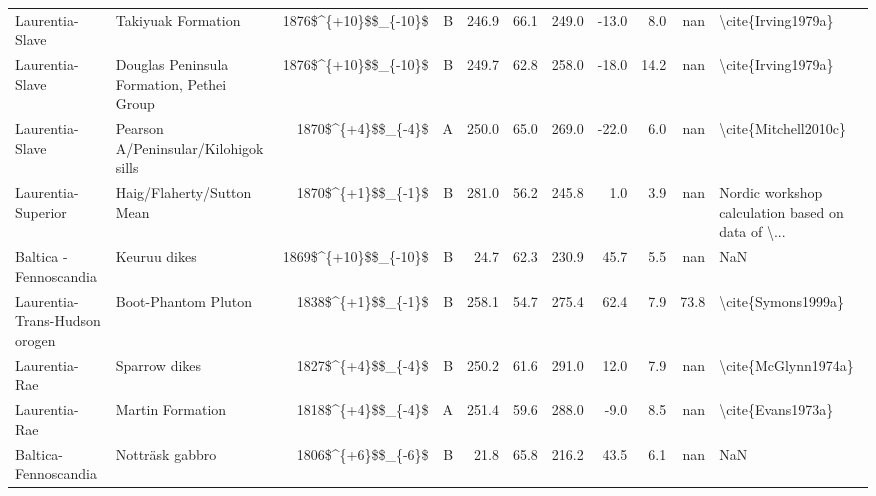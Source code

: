 \begin{longtable}{p{1 in}p{1 in}rrrrrrrr}
               Laurentia-Slave &                                 Takiyuak Formation &   1876\$\textasciicircum \{+10\}\$\$\_\{-10\}\$ &      B &     246.9 &      66.1 & 249.0 & -13.0 &       8.0 &         nan &                                 \textbackslash cite\{Irving1979a\} \\
               Laurentia-Slave &          Douglas Peninsula Formation, Pethei Group &   1876\$\textasciicircum \{+10\}\$\$\_\{-10\}\$ &      B &     249.7 &      62.8 & 258.0 & -18.0 &      14.2 &         nan &                                 \textbackslash cite\{Irving1979a\} \\
               Laurentia-Slave &               Pearson A/Peninsular/Kilohigok sills &     1870\$\textasciicircum \{+4\}\$\$\_\{-4\}\$ &      A &     250.0 &      65.0 & 269.0 & -22.0 &       6.0 &         nan &                               \textbackslash cite\{Mitchell2010c\} \\
            Laurentia-Superior &                         Haig/Flaherty/Sutton Mean  &     1870\$\textasciicircum \{+1\}\$\$\_\{-1\}\$ &      B &     281.0 &      56.2 & 245.8 &   1.0 &       3.9 &         nan &  Nordic workshop calculation based on data of \textbackslash ... \\
        Baltica - Fennoscandia &                                      Keuruu dikes  &   1869\$\textasciicircum \{+10\}\$\$\_\{-10\}\$ &     B  &      24.7 &      62.3 & 230.9 &  45.7 &       5.5 &         nan &                                                NaN \\
 Laurentia-Trans-Hudson orogen &                                Boot-Phantom Pluton &     1838\$\textasciicircum \{+1\}\$\$\_\{-1\}\$ &      B &     258.1 &      54.7 & 275.4 &  62.4 &       7.9 &        73.8 &                                 \textbackslash cite\{Symons1999a\} \\
                 Laurentia-Rae &                                      Sparrow dikes &     1827\$\textasciicircum \{+4\}\$\$\_\{-4\}\$ &      B &     250.2 &      61.6 & 291.0 &  12.0 &       7.9 &         nan &                                \textbackslash cite\{McGlynn1974a\} \\
                 Laurentia-Rae &                                   Martin Formation &     1818\$\textasciicircum \{+4\}\$\$\_\{-4\}\$ &      A &     251.4 &      59.6 & 288.0 &  -9.0 &       8.5 &         nan &                                  \textbackslash cite\{Evans1973a\} \\
          Baltica-Fennoscandia &                                    Notträsk gabbro &     1806\$\textasciicircum \{+6\}\$\$\_\{-6\}\$ &      B &      21.8 &      65.8 & 216.2 &  43.5 &       6.1 &         nan &                                                NaN \\

\end{longtable}
